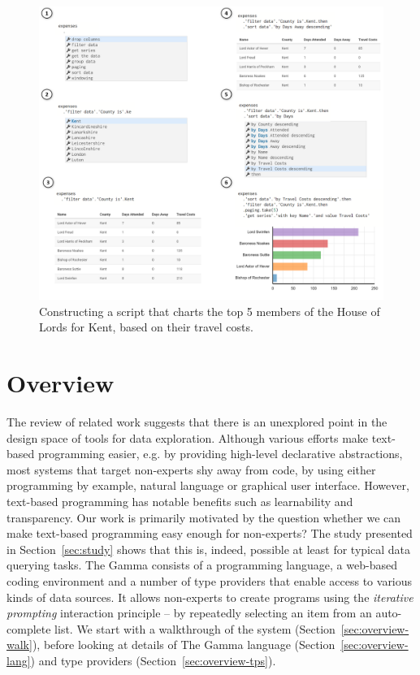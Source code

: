 \documentclass[manuscript,review,anonymous]{acmart}
\begin{document}
\begin{figure}[b]
\includegraphics[width=1\columnwidth]{figures/thegamma-walk}
\caption{Constructing a script that charts the top 5 members of the House of Lords for Kent, based
on their travel costs.}
\label{fig:walkthrough}
\end{figure}


\section{Overview}
\label{sec:overview}

The review of related work suggests that there is an unexplored point in the design space of tools
for data exploration. Although various efforts make text-based programming easier, e.g. by providing
high-level declarative abstractions, most systems that target non-experts shy away from code, by using
either programming by example, natural language or graphical user interface. However, text-based
programming has notable benefits such as learnability and transparency. Our work is primarily
motivated by the question whether we can make text-based programming easy enough for non-experts?
The study presented in Section~\ref{sec:study} shows that this is, indeed, possible at least for typical data querying tasks.
The Gamma consists of a programming language, a web-based coding environment and a number of type providers
that enable access to various kinds of data sources. It allows non-experts to create programs using the
\emph{iterative prompting} interaction principle -- by repeatedly selecting an item from an auto-complete list.
%
We start with a walkthrough of the system (Section~\ref{sec:overview-walk}), before looking at details of
The Gamma language (Section~\ref{sec:overview-lang}) and type providers (Section~\ref{sec:overview-tps}).
\end{document}
